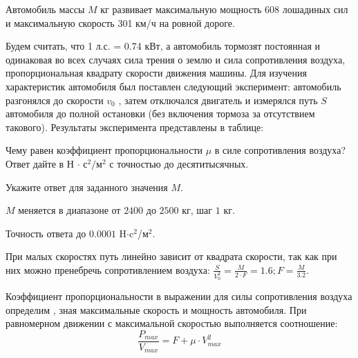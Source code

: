 
Автомобиль массы $M$ кг развивает максимальную мощность 608 лошадиных сил и максимальную скорость
301 км/ч на ровной дороге. 

Будем считать, что 1 л.с. = 0.74  кВт, а автомобиль тормозят постоянная и одинаковая во всех случаях сила трения о землю и сила сопротивления воздуха, пропорциональная квадрату скорости
движения машины. Для изучения характеристик автомобиля был поставлен следующий
эксперимент: автомобиль разгонялся до скорости $v_0$ , затем отключался двигатель и измерялся путь $S$ 
автомобиля до полной остановки (без включения тормоза за отсутствием такового).
Результаты эксперимента представлены в таблице:


Чему равен коэффициент пропорциональности $\mu$ в
силе сопротивления воздуха? Ответ дайте в Н $\cdot$ с$^2/$м$^2$ с точностью до десятитысячных.

Укажите ответ для заданного значения $M$.

\paramSection

$M$ меняется в диапазоне от $2400$ до $2500$ кг, шаг $1$ кг.

Точность ответа до  $0.0001$  H$\cdot$c$^2$/м$^2$.

\solutionSection

При малых скоростях путь линейно зависит от квадрата скорости, так как при них можно пренебречь сопротивлением воздуха: 
$\frac{S}{V_0^2} = \frac{M}{2 \cdot F}=1.6;  F=\frac{M}{3.2}.$ 

Коэффициент пропорциональности в выражении для силы сопротивления воздуха определим , зная максимальные скорость и мощность автомобиля. 
При  равномерном движении с максимальной скоростью выполняется соотношение:   $$\frac{P_{max}}{V_{max}} =F+\mu \cdot V_{max}^2 $$


